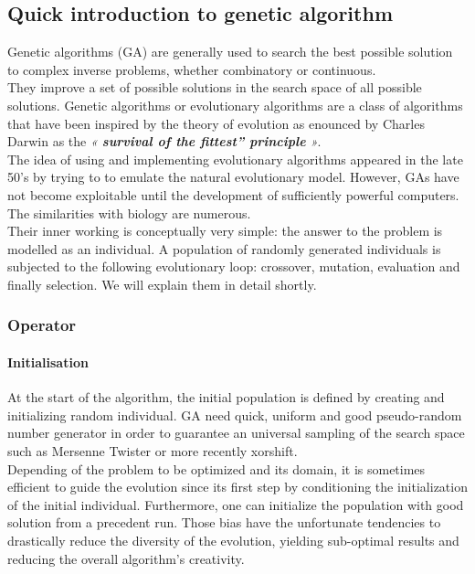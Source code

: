 \documentclass[12pt]{memoir}
\begin{document}
\subsection{Quick introduction to genetic algorithm} %
\label{sub:Quick introduction to genetic algorithm}


Genetic algorithms (GA) are generally used to search the best possible solution to complex inverse problems, whether combinatory or continuous. \\
They improve  a set of possible solutions in the search space of all possible solutions. Genetic algorithms or evolutionary algorithms are a class of algorithms that have been inspired by the theory of evolution as enounced by Charles Darwin as the \emph{« \textbf{survival of the fittest” principle} »}. \\
The idea of using and implementing evolutionary algorithms appeared in the late 50’s\cite{john1992adaptation} by trying to to emulate the natural evolutionary model. However, GAs have not become exploitable until the development of sufficiently powerful computers. The similarities with biology are numerous. \\
Their inner working is conceptually very simple: the answer to the problem is modelled as an  individual. A population of randomly generated individuals is subjected to the following evolutionary loop: crossover, mutation, evaluation and finally selection. We will explain them in detail shortly.



\subsubsection{Operator} %
\label{sub:}
\paragraph{Initialisation} %
\label{par:Initialisation}

At the start of the algorithm,  the initial population is defined by creating and initializing random individual. GA  need quick, uniform and good pseudo-random number generator in order to guarantee an universal sampling of the search space such as Mersenne Twister or more recently xorshift. \\
Depending of the problem to be optimized and its domain, it is sometimes efficient to guide the evolution since its first step by conditioning the initialization of the initial individual. Furthermore, one can initialize the population with good solution from a precedent run. Those bias have the unfortunate tendencies to drastically reduce the diversity of the evolution, yielding sub-optimal results and reducing the overall algorithm’s creativity.
\end{document}
